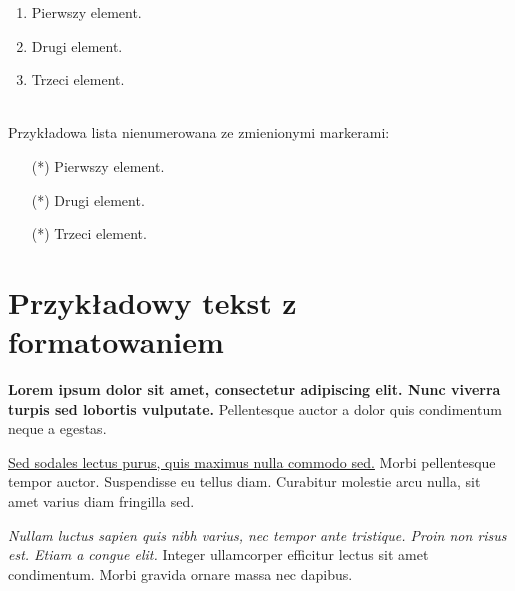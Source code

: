 \begin{enumerate}
    \item Pierwszy element.
    \item Drugi element.
    \item Trzeci element.
\end{enumerate}

\noindent
\\Przykładowa lista nienumerowana ze zmienionymi markerami:

\begin{itemize}
    \item[(*)] Pierwszy element.
    \item[(*)] Drugi element.
    \item[(*)] Trzeci element.
\end{itemize}


\section*{Przykładowy tekst z formatowaniem}
\textbf{Lorem ipsum dolor sit amet, consectetur adipiscing elit. Nunc viverra turpis sed lobortis vulputate.} Pellentesque auctor a dolor quis condimentum neque a egestas. 

\underline{Sed sodales lectus purus, quis maximus nulla commodo sed.} Morbi pellentesque tempor auctor. Suspendisse eu tellus diam. Curabitur molestie arcu nulla, sit amet varius diam fringilla sed. 

\emph{Nullam luctus sapien quis nibh varius, nec tempor ante tristique. Proin non risus est. Etiam a congue elit.} Integer ullamcorper efficitur lectus sit amet condimentum. Morbi gravida ornare massa nec dapibus.